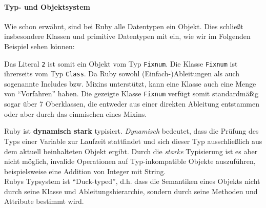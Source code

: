 \paragraph{Typ- und Objektsystem} %
Wie schon erwähnt, sind bei Ruby alle Datentypen ein Objekt. Dies schließt insbesondere Klassen und primitive Datentypen mit ein, wie wir im Folgenden Beispiel sehen können:
%
%
\begin{ruby}[label=IRB]

\end{ruby}

Das Literal \texttt{2} ist somit ein Objekt vom Typ \texttt{Fixnum}. Die Klasse \texttt{Fixnum} ist ihrerseits vom Typ \texttt{Class}. Da Ruby sowohl (Einfach-)Ableitungen als auch sogenannte Includes bzw. Mixins unterstützt, kann eine Klasse auch eine Menge von "`Vorfahren"' haben. Die gezeigte Klasse \texttt{Fixnum} verfügt somit standardmäßig sogar über 7 Oberklassen, die entweder aus einer direkten Ableitung entstammen oder aber durch das einmischen eines Mixins.


Ruby ist \textbf{dynamisch stark} typisiert. \textit{Dynamisch} bedeutet, dass die Prüfung des Typs einer Variable zur Laufzeit stattfindet und sich dieser Typ ausschließlich aus dem aktuell beinhalteten Objekt ergibt. Durch die \textit{starke} Typisierung ist es aber nicht möglich, invalide Operationen auf Typ-inkompatible Objekte auszuführen, beispielsweise eine Addition von Integer mit String. \\
Rubys Typsystem ist "`Duck-typed"', d.h. dass die Semantiken eines Objekts nicht durch seine Klasse und Ableitungshierarchie, sondern durch seine Methoden und Attribute bestimmt wird.

